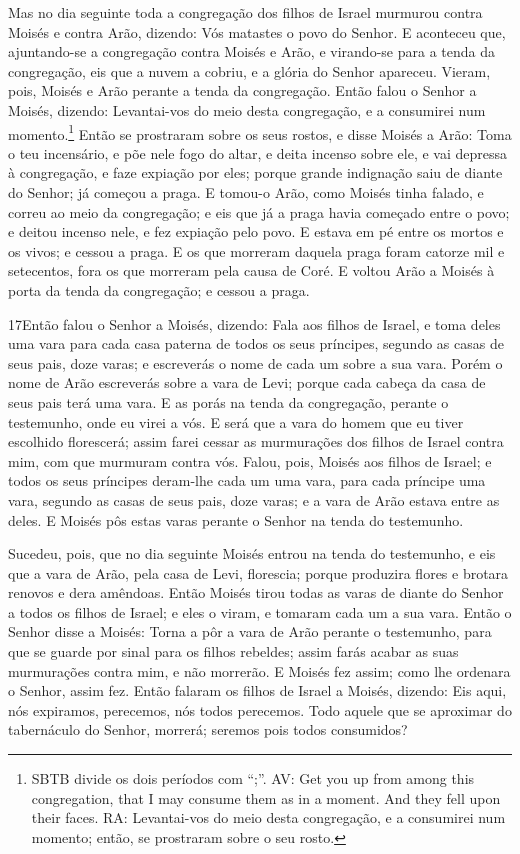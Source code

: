 Mas no dia seguinte toda a congregação dos filhos de Israel
murmurou contra Moisés e contra Arão, dizendo: Vós matastes o povo
do Senhor. E aconteceu que, ajuntando-se a congregação contra
Moisés e Arão, e virando-se para a tenda da congregação, eis que a
nuvem a cobriu, e a glória do Senhor apareceu. Vieram, pois,
Moisés e Arão perante a tenda da congregação. Então falou o
Senhor a Moisés, dizendo: Levantai-vos do meio desta
congregação, e a consumirei num momento.\footnote{SBTB divide os
dois períodos com ``;''. AV: Get you up from among this
congregation, that I may consume them as in a moment. And they fell
upon their faces. RA: Levantai-vos do meio desta congregação, e a
consumirei num momento; então, se prostraram sobre o seu rosto. }
Então se prostraram sobre os seus rostos, e disse Moisés a
Arão: Toma o teu incensário, e põe nele fogo do altar, e deita
incenso sobre ele, e vai depressa à congregação, e faze expiação por
eles; porque grande indignação saiu de diante do Senhor; já começou
a praga. E tomou-o Arão, como Moisés tinha falado, e correu
ao meio da congregação; e eis que já a praga havia começado entre o
povo; e deitou incenso nele, e fez expiação pelo povo. E
estava em pé entre os mortos e os vivos; e cessou a praga. E
os que morreram daquela praga foram catorze mil e setecentos, fora
os que morreram pela causa de Coré. E voltou Arão a Moisés à
porta da tenda da congregação; e cessou a praga.

\medskip

\lettrine{17} Então falou o Senhor a Moisés, dizendo: Fala
aos filhos de Israel, e toma deles uma vara para cada casa paterna
de todos os seus príncipes, segundo as casas de seus pais, doze
varas; e escreverás o nome de cada um sobre a sua vara. Porém o
nome de Arão escreverás sobre a vara de Levi; porque cada cabeça da
casa de seus pais terá uma vara. E as porás na tenda da
congregação, perante o testemunho, onde eu virei a vós. E será
que a vara do homem que eu tiver escolhido florescerá; assim farei
cessar as murmurações dos filhos de Israel contra mim, com que
murmuram contra vós. Falou, pois, Moisés aos filhos de Israel; e
todos os seus príncipes deram-lhe cada um uma vara, para cada
príncipe uma vara, segundo as casas de seus pais, doze varas; e a
vara de Arão estava entre as deles. E Moisés pôs estas varas
perante o Senhor na tenda do testemunho.

Sucedeu, pois, que no dia seguinte Moisés entrou na tenda do
testemunho, e eis que a vara de Arão, pela casa de Levi, florescia;
porque produzira flores e brotara renovos e dera amêndoas. Então
Moisés tirou todas as varas de diante do Senhor a todos os filhos de
Israel; e eles o viram, e tomaram cada um a sua vara. Então o
Senhor disse a Moisés: Torna a pôr a vara de Arão perante o
testemunho, para que se guarde por sinal para os filhos rebeldes;
assim farás acabar as suas murmurações contra mim, e não morrerão.
E Moisés fez assim; como lhe ordenara o Senhor, assim fez.
Então falaram os filhos de Israel a Moisés, dizendo: Eis
aqui, nós expiramos, perecemos, nós todos perecemos. Todo
aquele que se aproximar do tabernáculo do Senhor, morrerá; seremos
pois todos consumidos?

